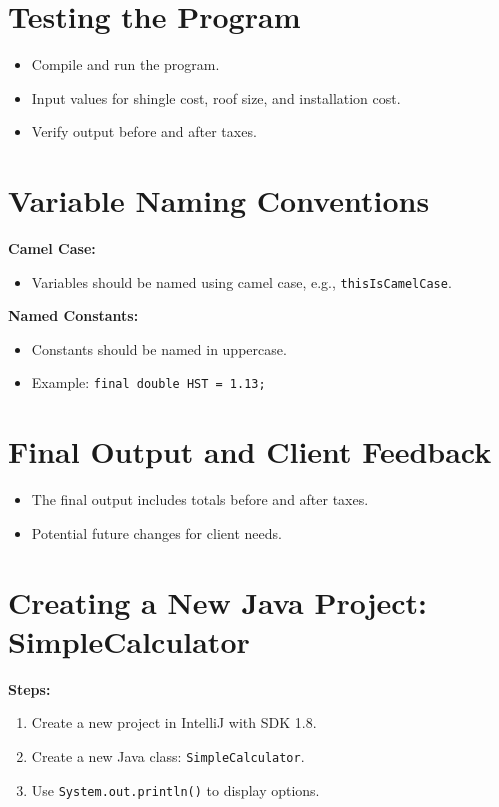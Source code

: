 \documentclass{article}
\begin{document}
\section{Testing the Program}
\begin{itemize}
    \item Compile and run the program.
    \item Input values for shingle cost, roof size, and installation cost.
    \item Verify output before and after taxes.
\end{itemize}

\section{Variable Naming Conventions}
\textbf{Camel Case:}
\begin{itemize}
    \item Variables should be named using camel case, e.g., \texttt{thisIsCamelCase}.
\end{itemize}

\textbf{Named Constants:}
\begin{itemize}
    \item Constants should be named in uppercase.
    \item Example: \texttt{final double HST = 1.13;}
\end{itemize}

\section{Final Output and Client Feedback}
\begin{itemize}
    \item The final output includes totals before and after taxes.
    \item Potential future changes for client needs.
\end{itemize}

\section{Creating a New Java Project: SimpleCalculator}
\textbf{Steps:}
\begin{enumerate}
    \item Create a new project in IntelliJ with SDK 1.8.
    \item Create a new Java class: \texttt{SimpleCalculator}.
    \item Use \texttt{System.out.println()} to display options.
\end{enumerate}
\end{document}

